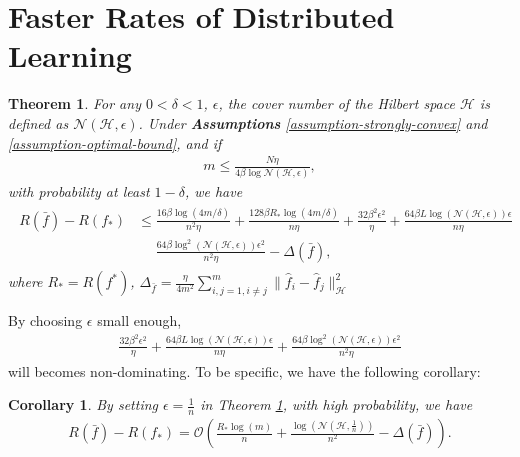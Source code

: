 \documentclass{article}
\newtheorem{theorem}{Theorem}
\newtheorem{corollary}{Corollary}
\begin{document}
\section{Faster Rates of Distributed Learning}
\begin{theorem}
\label{theorem-main}
For any $0<\delta<1$, $\epsilon$, the cover number of the Hilbert space $\mathcal{H}$ is defined as $\mathcal{N}(\mathcal{H},\epsilon)$.
Under \textbf{Assumptions} \ref{assumption-strongly-convex} and \ref{assumption-optimal-bound},
and if
  \begin{align}
    \label{equation-12}
    m\leq \frac{N\eta}{4\beta\log\mathcal{N}(\mathcal{H},\epsilon)},
  \end{align}
  with probability at least $1-\delta$,
  we have
  \begin{align}
    \label{equation-13}
    \begin{aligned}
    R(\bar{f})-R(f_\ast)&\leq
    \frac{16\beta \log(4m/\delta)}{n^2\eta}+\frac{128\beta R_\ast\log(4m/\delta)}{n\eta}+\frac{32\beta^2\epsilon^2}{\eta}+
    \frac{64\beta L \log\left(\mathcal{N}(\mathcal{H},\epsilon)\right)\epsilon}{n\eta}\\
   &~~~~~~\frac{64\beta \log^2\left(\mathcal{N}(\mathcal{H},\epsilon)\right)\epsilon^2}{n^2\eta}
   -\Delta(\bar{f}),
  \end{aligned}
  \end{align}
  where $R_\ast=R(f^\ast)$, $\Delta_{\bar{f}}=\frac{\eta}{4m^2}\sum_{i,j=1,i\not=j}^m\|\hat{f}_i-\hat{f}_j\|_\mathcal{H}^2$
\end{theorem}
By choosing $\epsilon$ small enough,
\begin{align*}
\frac{32\beta^2\epsilon^2}{\eta}+
    \frac{64\beta L \log\left(\mathcal{N}(\mathcal{H},\epsilon)\right)\epsilon}{n\eta}
    +\frac{64\beta \log^2\left(\mathcal{N}(\mathcal{H},\epsilon)\right)\epsilon^2}{n^2\eta}
\end{align*}
will becomes non-dominating.
To be specific, we have the following corollary:
\begin{corollary}
\label{corollary-first}
  By setting $\epsilon=\frac{1}{n}$ in Theorem \ref{theorem-main},
  with high probability,
  we have
  \begin{align*}
    R(\bar{f})-R(f_\ast)=\mathcal{O}\left(\frac{R_\ast\log(m)}{n}
    +\frac{\log(\mathcal{N}(\mathcal{H},\frac{1}{n}))}{n^2}
    -\Delta(\bar{f})\right).
  \end{align*}
\end{corollary}
\end{document}

